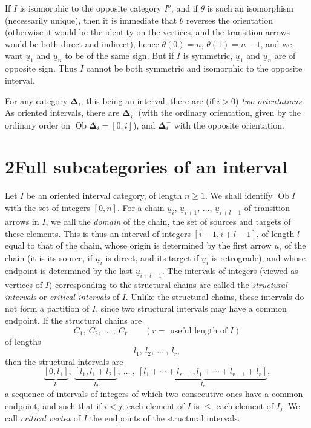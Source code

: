\documentclass[11pt]{article}
\newcommand{\printedpage}[1]{\marginpar{\footnotesize p.~#1}}
\newcommand{\msp}[1]{\marginpar{\footnotesize [#1]}}
\newcommand{\bD}{\boldsymbol{\Delta}}
\begin{document}
If $I$ is isomorphic to the opposite category $I^o$, and if $\theta$ is such an isomorphism (necessarily unique), then it is immediate that $\theta$ reverses the orientation (otherwise it would be the identity on the vertices, and the transition arrows would be both direct and indirect), hence $\theta(0) = n$, $\theta(1) = n-1$, and we want $\underline{u}_1$ and $\underline{u}_n$ to be of the same sign. But if $I$ is symmetric, $\underline{u}_1$ and $\underline{u}_n$ are of opposite sign. Thus $I$ cannot be both symmetric and isomorphic to the opposite interval.

For any category $\bD_i$, this being an interval, there are (if $i > 0$) \textit{two orientations.} As oriented intervals, there are $\bD_i^+$ (with the ordinary orientation, given by the ordinary order on $\operatorname{Ob} \bD_i = [0,i]$), and $\bD_i^-$ with the opposite orientation.

\printedpage{6}

\msp{page 10}

\section*{2\quad Full subcategories of an interval}

Let $I$ be an oriented interval category, of length $n \geq 1$. We shall identify $\operatorname{Ob} I$ with the set of integers $[0,n]$. For a chain $\underline{u}_i$, $\underline{u}_{i+1}$, $\ldots$, $\underline{u}_{i+l-1}$ of transition arrows in $I$, we call the \textit{domain} of the chain, the set of sources and targets of these elements. This is thus an interval of integers $[i-1, i+l-1]$, of length $l$ equal to that of the chain, whose origin is determined %
by the first arrow $\underline{u}_i$ of the chain (it is its source, if $\underline{u}_i$ is direct, and its target if $\underline{u}_i$ is retrograde), and whose endpoint is determined by the last $\underline{u}_{i+l-1}$. The intervals of integers (viewed as vertices of $I$) corresponding to the structural chains are called the \textit{structural intervals} or \textit{critical intervals} of $I$. Unlike the structural chains, these intervals do not form a partition of $I$, since two structural intervals may have a common endpoint. If the structural chains are
\[
C_1,\ C_2,\ \ldots\ ,\ C_r \qquad (r = \text{ useful length of } I)
\]
of lengths
\[
l_1,\ l_2,\ \ldots\ ,\ l_r,
\]
then the structural intervals are
\[
\underbrace{[0,l_1]}_{I_1},\ \underbrace{[l_1,l_1+l_2]}_{I_2},\ \ldots\ ,\ \underbrace{[l_1+\cdots+l_{r-1},l_1+\cdots+l_{r-1}+l_r]}_{I_r},
\]
a sequence of intervals of integers of which two consecutive ones have a common endpoint, and such that if $i < j$, each element of $I$ %
is $\leq$ each element of $I_j$. We call \textit{critical vertex} of $I$ the endpoints of the structural intervals.
\end{document}
